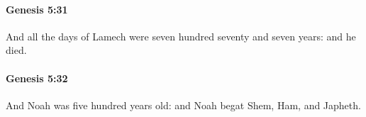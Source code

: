 		\paragraph{Genesis 5:31} %
			\label{GENESIS-5-31}

			And all the days of Lamech were seven hundred seventy and seven years: and he died.


		\paragraph{Genesis 5:32} %
			\label{GENESIS-5-32}

			And Noah was five hundred years old: and Noah begat Shem, Ham, and Japheth.

